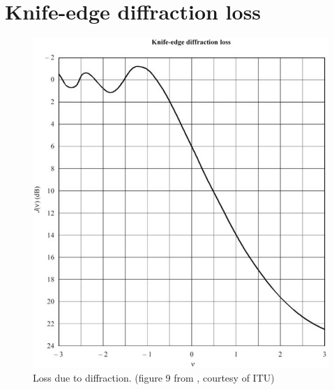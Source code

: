 \chapter{Knife-edge diffraction loss}
\begin{figure}[h]
\hspace{-2cm}
\includegraphics[scale=0.8]{figures/DiffractionLoss.PNG}
\caption{Loss due to diffraction. (figure 9 from \cite{ITU-R}, courtesy of ITU)}
\end{figure}